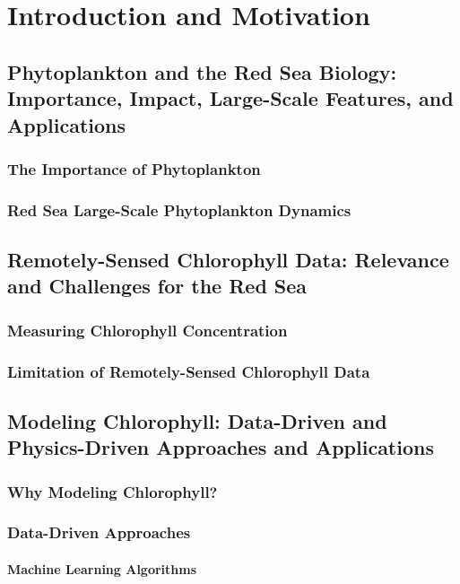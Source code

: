 \chapter{Introduction and Motivation}

\section{Phytoplankton and the Red Sea Biology: Importance, Impact, Large-Scale
Features, and Applications}

\subsection{The Importance of Phytoplankton}
\subsection{Red Sea Large-Scale Phytoplankton Dynamics}

\section{Remotely-Sensed Chlorophyll Data: Relevance and Challenges for the Red
Sea}

\subsection{Measuring Chlorophyll Concentration}
\subsection{Limitation of Remotely-Sensed Chlorophyll Data}

\section{Modeling Chlorophyll: Data-Driven and Physics-Driven Approaches and 
Applications}

\subsection{Why Modeling Chlorophyll?}

\subsection{Data-Driven Approaches}
\subsubsection{Machine Learning Algorithms}
